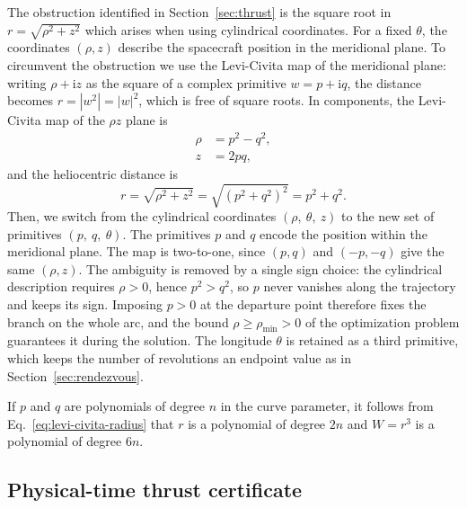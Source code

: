 The obstruction identified in Section~\ref{sec:thrust} is the square root in
$r=\sqrt{\rho^2+z^2}$ which arises when using cylindrical coordinates. For a
fixed $\theta$, the coordinates $(\rho,z)$ describe the spacecraft position
in the meridional plane. To circumvent the obstruction we use the Levi-Civita
map of the meridional plane: writing $\rho+\mathrm{i}z$ as the square of a
complex primitive $w=p+\mathrm{i}q$, the distance becomes
$r=|w^2|=|w|^2$, which is free of square roots. In components, the
Levi-Civita map of the $\rho z$ plane is
\begin{equation}
\begin{aligned}
\rho &= p^2-q^2,\\
z &= 2pq,
\end{aligned}
\label{eq:levi-civita-map}
\end{equation}
and the heliocentric distance is
\begin{equation}
r = \sqrt{\rho^2+z^2}=\sqrt{(p^2+q^2)^2}=p^2+q^2.
\label{eq:levi-civita-radius}
\end{equation}
Then, we switch from the cylindrical coordinates $(\rho,\>\theta,\> z)$ to the
new set of primitives $(p,\>q,\>\theta)$. The primitives $p$ and $q$ encode
the position within the meridional plane. The map is two-to-one, since
$(p,q)$ and $(-p,-q)$ give the same $(\rho,z)$. The ambiguity is removed by a
single sign choice: the cylindrical description requires $\rho>0$, hence
$p^2>q^2$, so $p$ never vanishes along the trajectory and keeps its sign.
Imposing $p>0$ at the departure point therefore fixes the branch on the
whole arc, and the bound $\rho\geq\rho_{\min}>0$ of the optimization problem
guarantees it during the solution. The longitude $\theta$ is retained as a
third primitive, which keeps the number of revolutions an endpoint value as
in Section~\ref{sec:rendezvous}.

If $p$ and $q$ are polynomials of degree $n$ in the curve parameter, it
follows from Eq.~\eqref{eq:levi-civita-radius} that $r$ is a polynomial of
degree $2n$ and $W=r^3$ is a polynomial of degree $6n$.

\subsection{Physical-time thrust certificate}
\label{sec:time-certificate}

